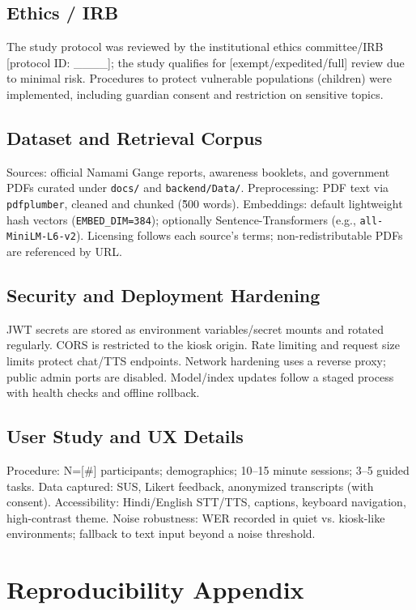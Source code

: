 \documentclass[conference]{IEEEtran}
\begin{document}
\subsection{Ethics / IRB}
The study protocol was reviewed by the institutional ethics committee/IRB [protocol ID: \_\_\_\_]; the study qualifies for [exempt/expedited/full] review due to minimal risk. Procedures to protect vulnerable populations (children) were implemented, including guardian consent and restriction on sensitive topics.

\subsection{Dataset and Retrieval Corpus}
Sources: official Namami Gange reports, awareness booklets, and government PDFs curated under \texttt{docs/} and \texttt{backend/Data/}. Preprocessing: PDF text via \texttt{pdfplumber}, cleaned and chunked (\~500 words). Embeddings: default lightweight hash vectors (\texttt{EMBED\_DIM=384}); optionally Sentence-Transformers (e.g., \texttt{all-MiniLM-L6-v2}). Licensing follows each source’s terms; non-redistributable PDFs are referenced by URL.

\subsection{Security and Deployment Hardening}
JWT secrets are stored as environment variables/secret mounts and rotated regularly. CORS is restricted to the kiosk origin. Rate limiting and request size limits protect chat/TTS endpoints. Network hardening uses a reverse proxy; public admin ports are disabled. Model/index updates follow a staged process with health checks and offline rollback.

\subsection{User Study and UX Details}
Procedure: N=[\#] participants; demographics; 10--15 minute sessions; 3--5 guided tasks. Data captured: SUS, Likert feedback, anonymized transcripts (with consent). Accessibility: Hindi/English STT/TTS, captions, keyboard navigation, high-contrast theme. Noise robustness: WER recorded in quiet vs. kiosk-like environments; fallback to text input beyond a noise threshold.

\section{Reproducibility Appendix}
\end{document}
